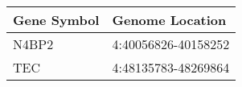 \begin{tabular}{ll}
\toprule
Gene Symbol &     Genome Location \\
\midrule
      N4BP2 & 4:40056826-40158252 \\
        TEC & 4:48135783-48269864 \\
\bottomrule
\end{tabular}

